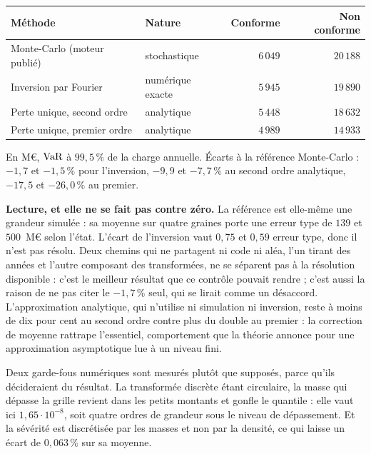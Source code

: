 \begin{center}\footnotesize
\renewcommand{\arraystretch}{1.25}
\begin{tabular}{@{}l l r r@{}}
\toprule
\textbf{Méthode} & \textbf{Nature} & \textbf{Conforme} & \textbf{Non conforme} \\
\midrule
Monte-Carlo (moteur publié) & stochastique & $6\,049$ & $20\,188$ \\
Inversion par Fourier & numérique exacte & $5\,945$ & $19\,890$ \\
Perte unique, second ordre & analytique & $5\,448$ & $18\,632$ \\
Perte unique, premier ordre & analytique & $4\,989$ & $14\,933$ \\
\bottomrule
\end{tabular}
\end{center}

\vspace{4pt}
\noindent En M\euro, $\mathrm{VaR}$ à $99{,}5\,\%$ de la charge annuelle. Écarts à la référence
Monte-Carlo : $-1{,}7$ et $-1{,}5\,\%$ pour l'inversion, $-9{,}9$ et $-7{,}7\,\%$ au second ordre
analytique, $-17{,}5$ et $-26{,}0\,\%$ au premier.

\textbf{Lecture, et elle ne se fait pas contre zéro.} La référence est elle-même une grandeur
simulée : sa moyenne sur quatre graines porte une erreur type de $139$ et $500$~M\euro{} selon
l'état. L'écart de l'inversion vaut $0{,}75$ et $0{,}59$ erreur type, donc il n'est pas
résolu. Deux chemins qui ne partagent ni code ni aléa, l'un tirant des années et l'autre
composant des transformées, ne se séparent pas à la résolution disponible : c'est le meilleur
résultat que ce contrôle pouvait rendre ; c'est aussi la raison de ne pas citer le $-1{,}7\,\%$
seul, qui se lirait comme un désaccord. L'approximation analytique, qui n'utilise ni simulation
ni inversion, reste à moins de dix pour cent au second ordre contre plus du double au premier :
la correction de moyenne rattrape l'essentiel, comportement que la théorie annonce pour une
approximation asymptotique lue à un niveau fini.

Deux garde-fous numériques sont mesurés plutôt que supposés, parce qu'ils décideraient du
résultat. La transformée discrète étant circulaire, la masse qui dépasse la grille revient dans
les petits montants et gonfle le quantile : elle vaut ici $1{,}65\cdot 10^{-8}$, soit quatre ordres
de grandeur sous le niveau de dépassement. Et la sévérité est discrétisée par les masses et non
par la densité, ce qui laisse un écart de $0{,}063\,\%$ sur sa moyenne.

